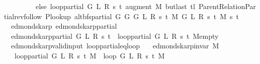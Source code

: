 \begin{isabellebody}
\ \ \ \ \ \ \ \ \ else\ loop{\isacharprime}{\kern0pt}{\isacharunderscore}{\kern0pt}partial\ G\ L\ R\ s\ t\ {\isacharparenleft}{\kern0pt}augment\ M\ {\isacharparenleft}{\kern0pt}butlast\ {\isacharparenleft}{\kern0pt}tl\ {\isacharparenleft}{\kern0pt}Parent{\isacharunderscore}{\kern0pt}Relation{\isacharunderscore}{\kern0pt}Partial{\isachardot}{\kern0pt}rev{\isacharunderscore}{\kern0pt}follow\ {\isacharparenleft}{\kern0pt}P{\isacharunderscore}{\kern0pt}lookup\ {\isacharparenleft}{\kern0pt}alt{\isacharunderscore}{\kern0pt}bfs{\isacharunderscore}{\kern0pt}partial\ {\isacharparenleft}{\kern0pt}G{}\ G\ {\isacharparenleft}{\kern0pt}G{}\ L\ R\ s\ t\ M{\isacharparenright}{\kern0pt}{\isacharparenright}{\kern0pt}\ {\isacharparenleft}{\kern0pt}G{}\ L\ R\ s\ t\ M{\isacharparenright}{\kern0pt}\ s{\isacharparenright}{\kern0pt}{\isacharparenright}{\kern0pt}\ t{\isacharparenright}{\kern0pt}{\isacharparenright}{\kern0pt}{\isacharparenright}{\kern0pt}{\isacharparenright}{\kern0pt}{\isacharparenright}{\kern0pt}{\isachardoublequoteclose}\isanewline
\isanewline
{}\isamarkupfalse%
\ {\isacharparenleft}{\kern0pt}\ edmonds{\isacharunderscore}{\kern0pt}karp{\isacharparenright}{\kern0pt}\ edmonds{\isacharunderscore}{\kern0pt}karp{\isacharunderscore}{\kern0pt}partial\ \isanewline
\ \ {\isachardoublequoteopen}edmonds{\isacharunderscore}{\kern0pt}karp{\isacharunderscore}{\kern0pt}partial\ G\ L\ R\ s\ t\ {\isasymequiv}\ loop{\isacharprime}{\kern0pt}{\isacharunderscore}{\kern0pt}partial\ G\ L\ R\ s\ t\ M{\isacharunderscore}{\kern0pt}empty{\isachardoublequoteclose}\isanewline
\isanewline
{}\isamarkupfalse%
\ {\isacharparenleft}{\kern0pt}\ edmonds{\isacharunderscore}{\kern0pt}karp{\isacharunderscore}{\kern0pt}valid{\isacharunderscore}{\kern0pt}input{\isacharparenright}{\kern0pt}\ loop{\isacharprime}{\kern0pt}{\isacharunderscore}{\kern0pt}partial{\isacharunderscore}{\kern0pt}eq{\isacharunderscore}{\kern0pt}loop{\isacharprime}{\kern0pt}{\isacharcolon}{\kern0pt}\isanewline
\ \ \ {\isachardoublequoteopen}edmonds{\isacharunderscore}{\kern0pt}karp{\isacharunderscore}{\kern0pt}invar{\isacharprime}{\kern0pt}{\isacharprime}{\kern0pt}\ M{\isachardoublequoteclose}\isanewline
\ \ \ {\isachardoublequoteopen}loop{\isacharprime}{\kern0pt}{\isacharunderscore}{\kern0pt}partial\ G\ L\ R\ s\ t\ M\ {\isacharequal}{\kern0pt}\ loop{\isacharprime}{\kern0pt}\ G\ L\ R\ s\ t\ M{\isachardoublequoteclose}\isanewline
%
\isadelimproof
\ \ %
\endisadelimproof
%
\isatagproof

\end{isabellebody}
